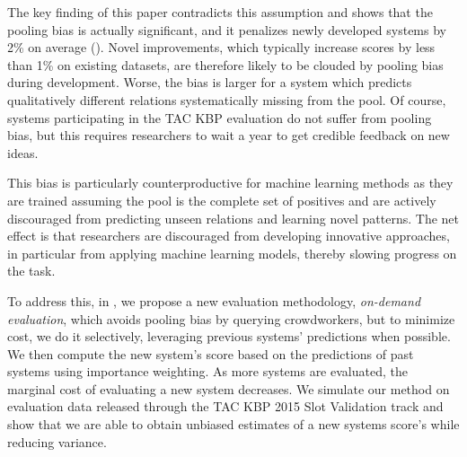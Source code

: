 The key finding of this paper contradicts this assumption and shows that the pooling bias is actually significant, and it penalizes newly developed systems by 2\% \fone{} on average ().
Novel improvements, which typically increase scores by less than 1\% \fone{} on existing datasets, are therefore likely to be clouded by pooling bias during development.
Worse, the bias is larger for a system which predicts qualitatively different relations systematically missing from the pool.
Of course, systems participating in the TAC KBP evaluation do not suffer from pooling bias, but this requires researchers to wait a year to get credible feedback on new ideas.

This bias is particularly counterproductive for machine learning methods as they are trained assuming the pool is the complete set of positives and are actively discouraged from predicting unseen relations and learning novel patterns.
The net effect is that researchers are discouraged from developing innovative approaches, in particular from applying machine learning models, thereby slowing progress on the task. 


To address this, in , we propose a new evaluation methodology, \emph{on-demand evaluation},
which avoids pooling bias by querying crowdworkers,
but to minimize cost, we do it selectively, leveraging previous systems' predictions when possible.
We then compute the new system's score based on the predictions of past systems using importance weighting.
As more systems are evaluated, the marginal cost of evaluating a new system decreases.
We simulate our method on evaluation data released through the TAC KBP 2015 Slot Validation track and show that we are able to obtain unbiased estimates of a new systems score's while reducing variance.

